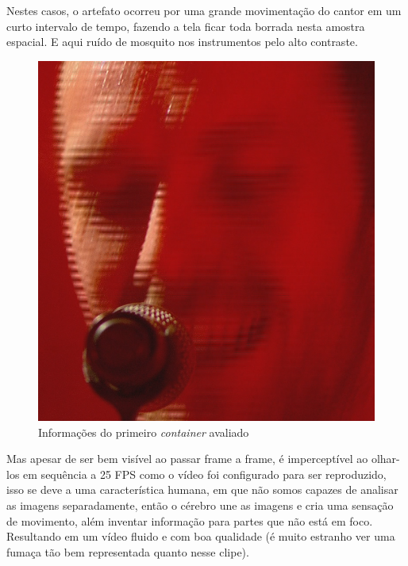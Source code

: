 Nestes casos, o artefato ocorreu por uma grande movimentação do cantor em um curto intervalo de tempo, fazendo a tela ficar toda borrada nesta amostra espacial. E aqui ruído de mosquito nos instrumentos pelo alto contraste.

\begin{figure}[H]
    \centering
    \caption{Informações do primeiro \textit{container} avaliado}
    \label{fig:imagem6}
    \includegraphics[scale=0.5]{Documeto/1-ElementosTextuais/images/06.png}
    
    \autoriaPropria
\end{figure}

\paragrafo Mas apesar de ser bem visível ao passar frame a frame, é imperceptível ao olhar-los em sequência a 25 FPS como o vídeo foi configurado para ser reproduzido, isso se deve a uma característica humana, em que não somos capazes de analisar as imagens separadamente, então o cérebro une as imagens e cria uma sensação de movimento, além inventar informação para partes que não está em foco. Resultando em um vídeo fluido e com boa qualidade (é muito estranho ver uma fumaça tão bem representada quanto nesse clipe).


